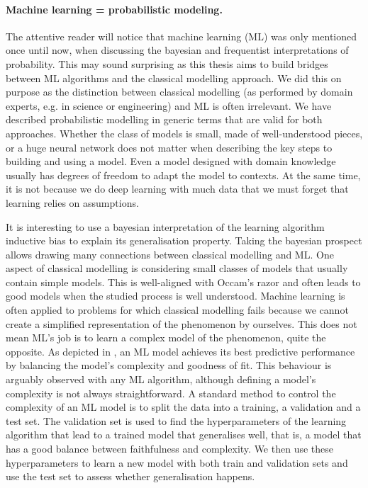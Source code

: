 \paragraph{Machine learning = probabilistic modeling.}
The attentive reader will notice that machine learning (ML) was only mentioned once until now, when discussing the bayesian and frequentist interpretations of probability.
This may sound surprising as this thesis aims to build bridges between ML algorithms and the classical modelling approach. We did this on purpose as the distinction between classical modelling (as performed by domain experts, e.g. in science or engineering) and ML is often irrelevant. We have described probabilistic modelling in generic terms that are valid for both approaches. Whether the class of models is small, made of well-understood pieces, or a huge neural network does not matter when describing the key steps to building and using a model. Even a model designed with domain knowledge usually has degrees of freedom to adapt the model to contexts. At the same time, it is not because we do deep learning with much data that we must forget that learning relies on assumptions.

It is interesting to use a bayesian interpretation of the learning algorithm inductive bias to explain its generalisation property. Taking the bayesian prospect allows drawing many connections between classical modelling and ML. One aspect of classical modelling is considering small classes of models that usually contain simple models. This is well-aligned with Occam's razor and often leads to good models when the studied process is well understood. Machine learning is often applied to problems for which classical modelling fails because we cannot create a simplified representation of the phenomenon by ourselves. This does not mean ML's job is to learn a complex model of the phenomenon, quite the opposite. As depicted in , an ML model achieves its best predictive performance by balancing the model's complexity and goodness of fit. This behaviour is arguably observed with any ML algorithm, although defining a model's complexity is not always straightforward. A standard method to control the complexity of an ML model is to split the data into a training, a validation and a test set. The validation set is used to find the hyperparameters of the learning algorithm that lead to a trained model that generalises well, that is, a model that has a good balance between faithfulness and complexity. We then use these hyperparameters to learn a new model with both train and validation sets and use the test set to assess whether generalisation happens. %

